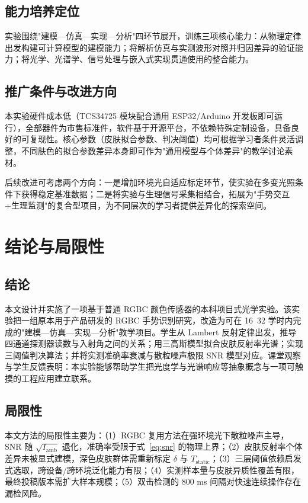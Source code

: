 \documentclass[11pt,a4paper]{ctexart}
\begin{document}
\subsection{能力培养定位}
\label{sec:adaptability_skills}

实验围绕"建模—仿真—实现—分析"四环节展开，训练三项核心能力：从物理定律出发构建可计算模型的建模能力；将解析仿真与实测波形对照并归因差异的验证能力；将光学、光谱学、信号处理与嵌入式实现贯通使用的整合能力。

\subsection{推广条件与改进方向}
\label{sec:adaptability_promotion}

本实验硬件成本低（TCS34725 模块配合通用 ESP32/Arduino 开发板即可运行），全部器件为市售标准件，软件基于开源平台，不依赖特殊定制设备，具备良好的可复现性。核心参数（皮肤拟合参数、判决阈值）均可根据学习者条件灵活调整，不同肤色的拟合参数差异本身即可作为"通用模型与个体差异"的教学讨论素材。

后续改进可考虑两个方向：一是增加环境光自适应标定环节，使实验在多变光照条件下获得稳定基准数据；二是将实验与生理信号采集相结合，拓展为"手势交互+生理监测"的复合型项目，为不同层次的学习者提供差异化的探索空间。

\section{结论与局限性}
\label{sec:conclusion}

\subsection{结论}

本文设计并实施了一项基于普通 RGBC 颜色传感器的本科项目式光学实验。该实验把一组原本用于产品研发的 RGBC 手势识别研究，改造为可在 16~32 学时内完成的"建模—仿真—实现—分析"教学项目。学生从 Lambert 反射定律出发，推导四通道探测器读数与入射角之间的关系；用三高斯模型拟合皮肤反射率光谱；实现三阈值判决算法；并将实测准确率衰减与散粒噪声极限 SNR 模型对应。课堂观察与学生反馈表明：本实验能够帮助学生把光度学与光谱响应等抽象概念与一项可触摸的工程应用建立联系。

\subsection{局限性}

本文方法的局限性主要为：（1）RGBC 复用方法在强环境光下散粒噪声主导，SNR 随 $\sqrt{I_{\mathrm{amb}}}$ 退化，准确率受限于式~\eqref{eq:snr} 的物理上界；（2）皮肤反射率个体差异未被显式建模，深色皮肤群体需重新标定 $\delta$ 与 $T_{\mathrm{static}}$；（3）三层阈值依赖启发式选取，跨设备/跨环境泛化能力有限；（4）实测样本量与皮肤异质性覆盖有限，最终投稿版本需扩大样本规模；（5）双击检测的 800 ms 间隔对快速连续操作存在漏检风险。
\end{document}
